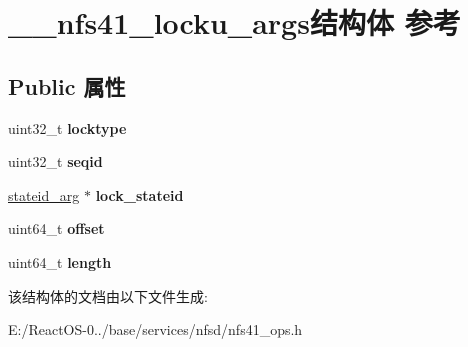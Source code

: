 \hypertarget{struct____nfs41__locku__args}{}\section{\+\_\+\+\_\+nfs41\+\_\+locku\+\_\+args结构体 参考}
\label{struct____nfs41__locku__args}
\subsection*{Public 属性}
\begin{DoxyCompactItemize}
\item 
\mbox{\label{struct____nfs41__locku__args_a2386568fe1d7e9f231a716c3b5bd6d48}} 
uint32\+\_\+t {\bfseries locktype}
\item 
\mbox{\label{struct____nfs41__locku__args_a4fc4acd0c6f81d9fa7a8c4e1cb269a2f}} 
uint32\+\_\+t {\bfseries seqid}
\item 
\mbox{\label{struct____nfs41__locku__args_a8d3f03552e5981c0a13dfc5f997f264d}} 
\hyperlink{struct____stateid__arg}{stateid\+\_\+arg} $\ast$ {\bfseries lock\+\_\+stateid}
\item 
\mbox{\label{struct____nfs41__locku__args_a58fe35a4562a56608a278e3035c48e7d}} 
uint64\+\_\+t {\bfseries offset}
\item 
\mbox{\label{struct____nfs41__locku__args_a0f6115f793de492a7d595de7374627c8}} 
uint64\+\_\+t {\bfseries length}
\end{DoxyCompactItemize}


该结构体的文档由以下文件生成\+:\begin{DoxyCompactItemize}
\item 
E\+:/\+React\+O\+S-\/0../base/services/nfsd/nfs41\+\_\+ops.\+h\end{DoxyCompactItemize}

